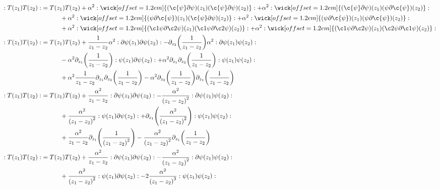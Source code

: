 \begin{align*}
    \cnord{T\qty(z_1) T\qty(z_2)}&={ T\qty(z_1)T\qty(z_2)}+\alpha^2\cnord{\wick[offset=1.2em]{(\c{\psi}\partial\psi)\qty(z_1)(\c{\psi}\partial\psi)\qty(z_2)}}+\alpha^2\cnord{\wick[offset=1.2em]{(\c{\psi}\partial\psi)\qty(z_1)({\psi}\partial\c{\psi})\qty(z_2)}}\\
    &\quad\quad\quad+\alpha^2\cnord{\wick[offset=1.2em]{({\psi}\partial\c{\psi})\qty(z_1)(\c{\psi}\partial{\psi})\qty(z_2)}}+\alpha^2\cnord{\wick[offset=1.2em]{({\psi}\partial\c{\psi})\qty(z_1)({\psi}\partial\c{\psi})\qty(z_2)}}\\
    &\quad\quad\quad+\alpha^2\cnord{\wick[offset=1.2em]{(\c1{\psi}\partial\c2{\psi})\qty(z_1)(\c1{\psi}\partial\c2{\psi})\qty(z_2)}}+\alpha^2\cnord{\wick[offset=1.2em]{(\c1{\psi}\partial\c2{\psi})\qty(z_1)(\c2{\psi}\partial\c1{\psi})\qty(z_2)}}\\
    \cnord{T\qty(z_1) T\qty(z_2)}&={ T\qty(z_1)T\qty(z_2)}+\frac{1}{z_1-z_2}\alpha^2\cnord{\partial\psi\qty(z_1)\partial\psi\qty(z_2)}-\partial_{z_2}\qty(\frac{1}{z_1-z_2})\alpha^2\cnord{\partial\psi\qty(z_1)\psi\qty(z_2)}\\
    &\quad\quad\quad-\alpha^2\partial_{z_1}\qty(\frac{1}{z_1-z_2})\cnord{{\psi}\qty(z_1)\partial{\psi}\qty(z_2)}+\alpha^2\partial_{z_1}\partial_{z_2}\qty(\frac{1}{z_1-z_2})\cnord{{\psi}\qty(z_1){\psi}\qty(z_2)}\\
    &\quad\quad\quad+\alpha^2\frac{1}{z_1-z_2}\partial_{z_1}\partial_{z_2}\qty(\frac{1}{z_1-z_2})-\alpha^2\partial_{z_2}\qty(\frac{1}{z_1-z_2})\partial_{z_1}\qty(\frac{1}{z_1-z_2})\\
    \cnord{T\qty(z_1) T\qty(z_2)}&={ T\qty(z_1)T\qty(z_2)}+\frac{\alpha^2}{z_1-z_2}\cnord{\partial\psi\qty(z_1)\partial\psi\qty(z_2)}-\frac{\alpha^2}{\qty(z_1-z_2)^2}\cnord{\partial\psi\qty(z_1)\psi\qty(z_2)}\\
    &\quad\quad\quad+\frac{\alpha^2}{\qty(z_1-z_2)^2}\cnord{{\psi}\qty(z_1)\partial{\psi}\qty(z_2)}+\partial_{z_1}\qty(\frac{\alpha^2}{\qty(z_1-z_2)^2})\cnord{{\psi}\qty(z_1){\psi}\qty(z_2)}\\
    &\quad\quad\quad+\frac{\alpha^2}{z_1-z_2}\partial_{z_1}\qty(\frac{1}{\qty(z_1-z_2)^2})-\frac{\alpha^2}{\qty(z_1-z_2)^2}\partial_{z_1}\qty(\frac{1}{z_1-z_2})\\
    \cnord{T\qty(z_1) T\qty(z_2)}&={ T\qty(z_1)T\qty(z_2)}+\frac{\alpha^2}{z_1-z_2}\cnord{\partial\psi\qty(z_1)\partial\psi\qty(z_2)}-\frac{\alpha^2}{\qty(z_1-z_2)^2}\cnord{\partial\psi\qty(z_1)\psi\qty(z_2)}\\
    &\quad\quad\quad+\frac{\alpha^2}{\qty(z_1-z_2)^2}\cnord{{\psi}\qty(z_1)\partial{\psi}\qty(z_2)}-2\frac{\alpha^2}{\qty(z_1-z_2)^3}\cnord{{\psi}\qty(z_1){\psi}\qty(z_2)}\\

\end{align*}
